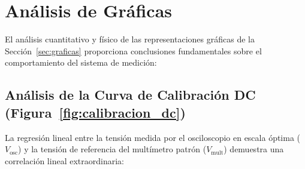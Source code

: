 
\section{Análisis de Gráficas}
\label{sec:analisis_graficas}

El análisis cuantitativo y físico de las representaciones gráficas de la Sección~\ref{sec:graficas} proporciona conclusiones fundamentales sobre el comportamiento del sistema de medición:

\subsection{Análisis de la Curva de Calibración DC (Figura~\ref{fig:calibracion_dc})}
La regresión lineal entre la tensión medida por el osciloscopio en escala óptima ($V_{\text{osc}}$) y la tensión de referencia del multímetro patrón ($V_{\text{mult}}$) demuestra una correlación lineal extraordinaria:
